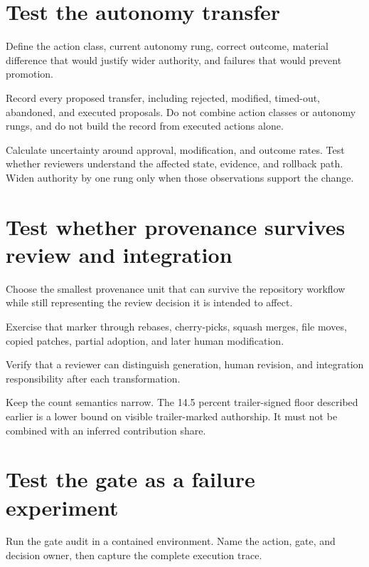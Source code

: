 \hypertarget{test-the-autonomy-transfer}{%
\section{Test the autonomy transfer}\label{test-the-autonomy-transfer}}

Define the action class, current autonomy rung, correct outcome, material difference that would justify wider authority, and failures that would prevent promotion.

Record every proposed transfer, including rejected, modified, timed-out, abandoned, and executed proposals. Do not combine action classes or autonomy rungs, and do not build the record from executed actions alone.

Calculate uncertainty around approval, modification, and outcome rates. Test whether reviewers understand the affected state, evidence, and rollback path. Widen authority by one rung only when those observations support the change.

\hypertarget{test-whether-provenance-survives-review-and-integration}{%
\section{Test whether provenance survives review and integration}\label{test-whether-provenance-survives-review-and-integration}}

Choose the smallest provenance unit that can survive the repository workflow while still representing the review decision it is intended to affect.

Exercise that marker through rebases, cherry-picks, squash merges, file moves, copied patches, partial adoption, and later human modification.

Verify that a reviewer can distinguish generation, human revision, and integration responsibility after each transformation.

Keep the count semantics narrow. The 14.5 percent trailer-signed floor described earlier is a lower bound on visible trailer-marked authorship. It must not be combined with an inferred contribution share.

\hypertarget{test-the-gate-as-a-failure-experiment}{%
\section{Test the gate as a failure experiment}\label{test-the-gate-as-a-failure-experiment}}

Run the gate audit in a contained environment. Name the action, gate, and decision owner, then capture the complete execution trace.

